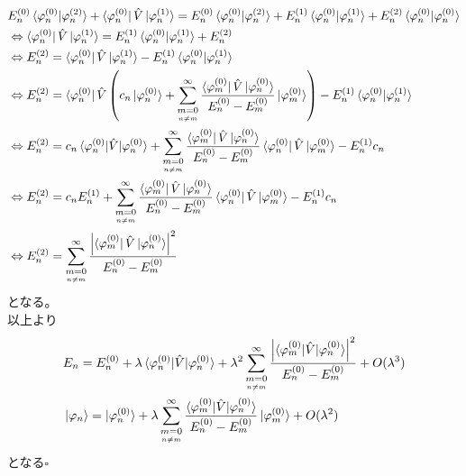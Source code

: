 \documentclass{jsarticle}  %
\numberwithin{equation}{section} %
\numberwithin{figure}{section}
\begin{document}
    \begin{align}
        &E_n^{(0)}\braket{\varphi_n^{(0)}|\varphi_n^{(2)}} + \bra{\varphi_n^{(0)}}\hat{V}\ket{\varphi_n^{(1)}} = E_n^{(0)}\braket{\varphi_n^{(0)}|\varphi_n^{(2)}} + E_n^{(1)}\braket{\varphi_n^{(0)}|\varphi_n^{(1)}} + E_n^{(2)}\braket{\varphi_n^{(0)}|\varphi_n^{(0)}}  \notag \\
        &\Leftrightarrow  \bra{\varphi_n^{(0)}}\hat{V}\ket{\varphi_n^{(1)}} = E_n^{(1)}\braket{\varphi_n^{(0)}|\varphi_n^{(1)}} + E_n^{(2)} \notag \\
        &\Leftrightarrow E_n^{(2)} = \bra{\varphi_n^{(0)}}\hat{V}\ket{\varphi_n^{(1)}} - E_n^{(1)}\braket{\varphi_n^{(0)}|\varphi_n^{(1)}} \notag \\
        &\Leftrightarrow E_n^{(2)} = \bra{\varphi_n^{(0)}}\hat{V} \left( c_n\ket{\varphi_n^{(0)}} + \sum_{\underset{n\ne m}{m=0}}^\infty \frac{\bra{\varphi_m^{(0)}}\hat{V}\ket{\varphi_n^{(0)}}}{E_n^{(0)}-E_m^{(0)}}\ket{\varphi_m^{(0)}}  \right) - E_n^{(1)}\braket{\varphi_n^{(0)}|\varphi_n^{(1)}} \notag \\
        &\Leftrightarrow E_n^{(2)} = c_n\braket{\varphi_n^{(0)}|\hat{V}|\varphi_n^{(0)}} + \sum_{\underset{n\ne m}{m=0}}^\infty \frac{\bra{\varphi_m^{(0)}}\hat{V}\ket{\varphi_n^{(0)}}}{E_n^{(0)}-E_m^{(0)}}\bra{\varphi_n^{(0)}}\hat{V}\ket{\varphi_m^{(0)}} - E_n^{(1)}c_n \notag \\
        &\Leftrightarrow E_n^{(2)} = c_nE_n^{(1)} + \sum_{\underset{n\ne m}{m=0}}^\infty \frac{\bra{\varphi_m^{(0)}}\hat{V}\ket{\varphi_n^{(0)}}}{E_n^{(0)}-E_m^{(0)}}\bra{\varphi_n^{(0)}}\hat{V}\ket{\varphi_m^{(0)}} - E_n^{(1)}c_n \notag \\
        &\Leftrightarrow E_n^{(2)} = \sum_{\underset{n\ne m}{m=0}}^\infty \frac{\left| \bra{\varphi_m^{(0)}}\hat{V}\ket{\varphi_n^{(0)}} \right|^2}{E_n^{(0)}-E_m^{(0)}}
    \end{align}
    となる。\\
    以上より
    \begin{align}
        \begin{aligned}
            &E_n = E_n^{(0)} + \lambda \braket{\varphi_n^{(0)}|\hat{V}|\varphi_n^{(0)}} + \lambda^2 \sum_{\underset{n\ne m}{m=0}}^\infty \frac{\left| \braket{\varphi_m^{(0)}|\hat{V}|\varphi_n^{(0)}} \right|^2}{E_n^{(0)} - E_m^{(0)}} +O(\lambda^3)\\
            &\ket{\varphi_n} = \ket{\varphi_n^{(0)}} + \lambda \sum_{\underset{n\ne m}{m=0}}^\infty \frac{ \braket{\varphi_m^{(0)}|\hat{V}|\varphi_n^{(0)}} }{E_n^{(0)} - E_m^{(0)}} \ket{\varphi_m^{(0)}} +O(\lambda^2)
        \end{aligned}
    \end{align}
    となる$\square$
\end{document}
